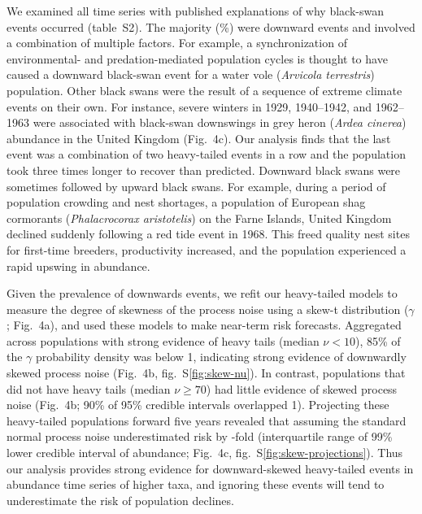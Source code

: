 We examined all time series with published explanations of why black-swan events occurred (table~S2). The majority (\percBSDown \%) were downward events and involved a combination of multiple factors. For example, a synchronization of environmental- and predation-mediated population cycles is thought to have caused a downward black-swan event for a water vole (\emph{Arvicola terrestris}) population\cite{saucy1994}. Other black swans were the result of a sequence of extreme climate events on their own. For instance, severe winters in 1929, 1940--1942, and 1962--1963 were associated with black-swan downswings in grey heron (\emph{Ardea cinerea}) abundance in the United Kingdom\cite{stafford1971} (Fig.~4c). Our analysis finds that the last event was a combination of two heavy-tailed events in a row and the population took three times longer to recover than predicted\cite{stafford1971}. Downward black swans were sometimes followed by upward black swans. For example, during a period of population crowding and nest shortages, a population of European shag cormorants (\emph{Phalacrocorax aristotelis}) on the Farne Islands, United Kingdom declined suddenly following a red tide event in 1968\cite{potts1980}. This freed quality nest sites for first-time breeders, productivity increased, and the population experienced a rapid upswing in abundance\cite{potts1980}.

Given the prevalence of downwards events, we refit our heavy-tailed models to measure the degree of skewness of the process noise using a skew-t distribution (\(\gamma\); Fig.~4a), and used these models to make near-term risk forecasts. Aggregated across populations with strong evidence of heavy tails (median \(\nu < 10\)), 85\% of the \(\gamma\) probability density was below 1, indicating strong evidence of downwardly skewed process noise (Fig.~4b, fig.~S\ref{fig:skew-nu}). In contrast, populations that did not have heavy tails (median \(\nu \geq 70\)) had little evidence of skewed process noise (Fig.~4b; 90\% of 95\% credible intervals overlapped 1). Projecting these heavy-tailed populations forward five years revealed that assuming the standard normal process noise underestimated risk by \crashUnderRange-fold (interquartile range of 99\% lower credible interval of abundance; Fig.~4c, fig.~S\ref{fig:skew-projections}). Thus our analysis provides strong evidence for downward-skewed heavy-tailed events in abundance time series of higher taxa, and ignoring these events will tend to underestimate the risk of population declines.

